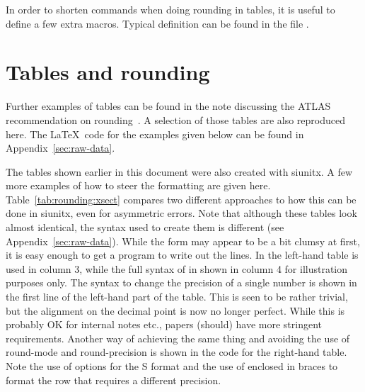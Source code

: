 \documentclass[UKenglish]{../../latex/atlasdoc}
\begin{document}
In order to shorten commands when doing rounding in tables, it is useful to define a few extra macros.
Typical definition can be found in the file .


\section{Tables and rounding}

Further examples of tables can be found in the note discussing the ATLAS recommendation on rounding~\cite{atlas-rounding}.
A selection of those tables are also reproduced here.
The \LaTeX\ code for the examples given below can be found in 
Appendix~\ref{sec:raw-data}.

The tables shown earlier in this document were also created with \textsf{siunitx}.
A few more examples of how to steer the formatting are given here.
Table~\ref{tab:rounding:xsect} compares two different approaches
to how this can be done  in \textsf{siunitx}, even for asymmetric errors.  Note that although these
tables look almost identical, the syntax used to create them is different (see Appendix~\ref{sec:raw-data}).
While the form may appear to be a bit clumsy at first, it is easy enough to get a
program to write out the lines. In the left-hand table
 is used in column 3, while the full syntax of  
in shown in column 4 for illustration purposes only.  The syntax
to change the precision of a single number is shown in the first line of
the left-hand part of the table. This is seen to be rather
trivial, but the alignment on the decimal point is now no longer
perfect. While this is probably OK for internal notes etc., papers
(should) have more stringent requirements. Another way of achieving
the same thing and avoiding the use of \textsf{round-mode} and
\textsf{round-precision} is shown in the code for the right-hand table. Note the
use of options for the \textsf{S} format and the use of  enclosed
in braces to format the row that requires a different precision.
\end{document}
